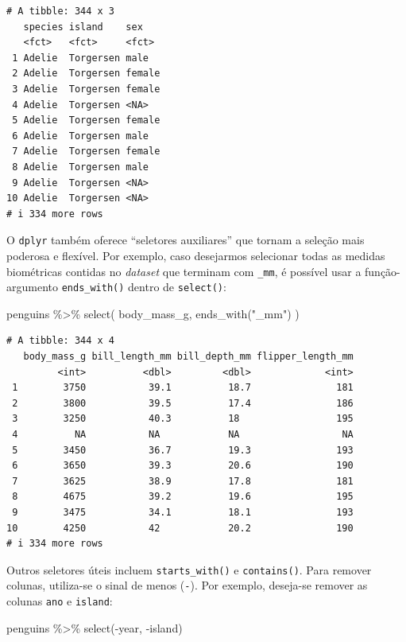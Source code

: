 \documentclass[
  12pt,
  letterpaper,
  DIV=11,
  numbers=noendperiod]{scrreprt}
\newenvironment{Shaded}{\begin{snugshade}}{\end{snugshade}}
\newcommand{\FunctionTok}[1]{\textcolor[rgb]{0.28,0.35,0.67}{#1}}
\newcommand{\NormalTok}[1]{\textcolor[rgb]{0.00,0.23,0.31}{#1}}
\newcommand{\SpecialCharTok}[1]{\textcolor[rgb]{0.37,0.37,0.37}{#1}}
\newcommand{\StringTok}[1]{\textcolor[rgb]{0.13,0.47,0.30}{#1}}
\theoremstyle{definition}
\theoremstyle{exemplo}
\begin{document}
\begin{verbatim}
# A tibble: 344 x 3
   species island    sex   
   <fct>   <fct>     <fct> 
 1 Adelie  Torgersen male  
 2 Adelie  Torgersen female
 3 Adelie  Torgersen female
 4 Adelie  Torgersen <NA>  
 5 Adelie  Torgersen female
 6 Adelie  Torgersen male  
 7 Adelie  Torgersen female
 8 Adelie  Torgersen male  
 9 Adelie  Torgersen <NA>  
10 Adelie  Torgersen <NA>  
# i 334 more rows
\end{verbatim}

\noindent O \texttt{dplyr} também oferece ``seletores auxiliares'' que
tornam a seleção mais poderosa e flexível. Por exemplo, caso desejarmos
selecionar todas as medidas biométricas contidas no \emph{dataset} que
terminam com \texttt{\_mm}, é possível usar a função-argumento
\texttt{ends\_with()} dentro de \texttt{select()}:

\begin{Shaded}
\begin{Highlighting}[]
\NormalTok{penguins }\SpecialCharTok{\%\textgreater{}\%} 
  \FunctionTok{select}\NormalTok{(}
\NormalTok{    body\_mass\_g, }\FunctionTok{ends\_with}\NormalTok{(}\StringTok{"\_mm"}\NormalTok{)}
\NormalTok{  )}
\end{Highlighting}
\end{Shaded}

\begin{verbatim}
# A tibble: 344 x 4
   body_mass_g bill_length_mm bill_depth_mm flipper_length_mm
         <int>          <dbl>         <dbl>             <int>
 1        3750           39.1          18.7               181
 2        3800           39.5          17.4               186
 3        3250           40.3          18                 195
 4          NA           NA            NA                  NA
 5        3450           36.7          19.3               193
 6        3650           39.3          20.6               190
 7        3625           38.9          17.8               181
 8        4675           39.2          19.6               195
 9        3475           34.1          18.1               193
10        4250           42            20.2               190
# i 334 more rows
\end{verbatim}

\noindent Outros seletores úteis incluem \texttt{starts\_with()} e
\texttt{contains()}. Para remover colunas, utiliza-se o sinal de menos
(\texttt{-}). Por exemplo, deseja-se remover as colunas \texttt{ano} e
\texttt{island}:

\begin{Shaded}
\begin{Highlighting}[]
\NormalTok{penguins }\SpecialCharTok{\%\textgreater{}\%} 
  \FunctionTok{select}\NormalTok{(}\SpecialCharTok{{-}}\NormalTok{year, }\SpecialCharTok{{-}}\NormalTok{island)}
\end{Highlighting}
\end{Shaded}
\end{document}
